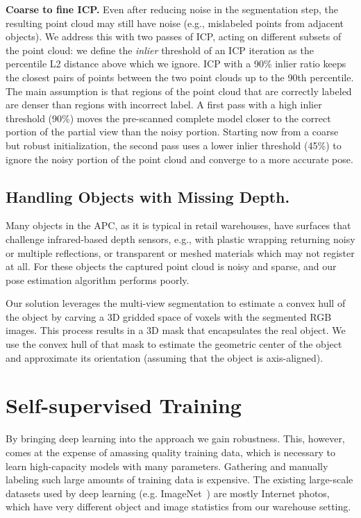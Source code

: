 \documentclass[letterpaper, 10 pt, conference]{ieeeconf}  %
\newcommand{\myparagraph}[1]{\vspace{0.1in}\noindent\textbf{#1}}
\begin{document}
\myparagraph{Coarse to fine ICP.}
Even after reducing noise in the segmentation step, the resulting point cloud may still have noise (e.g., mislabeled points from adjacent objects). We address this with two passes of ICP, acting on different subsets of the point cloud: we define the \emph{inlier} threshold of an ICP iteration as the percentile L2 distance above which we ignore. ICP with a 90\% inlier ratio keeps the closest pairs of points between the two point clouds up to the 90th percentile.
The main assumption is that regions of the point cloud that are correctly labeled are denser than regions with incorrect label. A first pass with a high inlier threshold (90\%) moves the pre-scanned complete model closer to the correct portion of the partial view than the noisy portion. 
Starting now from a coarse but robust initialization, the second pass uses a lower inlier threshold (45\%) to ignore the noisy portion of the point cloud and converge to a more accurate pose.




\subsection{Handling Objects with Missing Depth.}
Many objects in the APC, as it is typical in retail warehouses, have surfaces that challenge infrared-based depth sensors, e.g., with plastic wrapping returning noisy or multiple reflections, or transparent or meshed materials which may not register at all. For these objects the captured point cloud is noisy and sparse, and our pose estimation algorithm performs poorly.

Our solution leverages the multi-view segmentation to estimate a convex hull of the object by carving a 3D gridded space of voxels with the segmented RGB images. This process results in a 3D mask that encapsulates the real object. We use the convex hull of that mask to estimate the geometric center of the object and approximate its orientation (assuming that the object is axis-aligned).



\section{Self-supervised Training}
By bringing deep learning into the approach we gain robustness. This, however, comes at the expense of amassing quality training data, which is necessary to learn high-capacity models with many parameters.
Gathering and manually labeling such large amounts of training data is expensive. The existing large-scale datasets used by deep learning (e.g. ImageNet~\cite{ILSVRC15}) are mostly Internet photos, which have very different object and image statistics from our warehouse setting.
\end{document}
